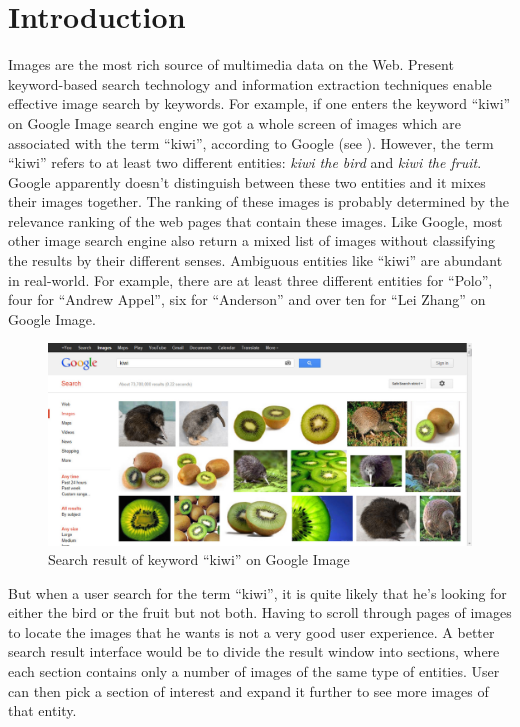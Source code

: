 \section{Introduction}
\label{intro}
Images are the most rich source of multimedia data on the Web.
Present keyword-based search technology and information extraction
techniques enable effective image search by keywords.
For example, if one enters the keyword ``kiwi'' on Google Image search engine
we got a whole screen of images which are associated with the term ``kiwi'',
according to Google (see ).
However, the term ``kiwi'' refers to at least two different entities:
{\em kiwi the bird} and {\em kiwi the fruit}. Google apparently doesn't
distinguish between these two entities and it mixes their images together.
The ranking of these images is probably determined by the relevance
ranking of the web pages that contain these images.
Like Google, most other image search engine also return a mixed list of images
without classifying the results by their different senses.
Ambiguous entities like ``kiwi'' are abundant in real-world. For example,
there are at least three different entities for ``Polo'',
four for ``Andrew Appel'', six for ``Anderson'' and over
ten for ``Lei Zhang'' on Google Image.

\begin{figure}[h]
\begin{center}
\centering
\includegraphics[width=0.9\columnwidth]{search_kiwi.eps}
\caption{Search result of keyword ``kiwi'' on Google Image}
\label{fig:search-kiwi-on-google}
\end{center}
\end{figure}

But when a user search for the term ``kiwi'', it is quite likely that he's
looking for either the bird or the fruit but not both. Having to scroll through
pages of images to locate the images that he wants is not a very good
user experience. A better search result interface would be to divide the
result window into sections, where each section contains only a number of
images of the same type of entities. User can then pick a section of interest
and expand it further to see more images of that entity.


